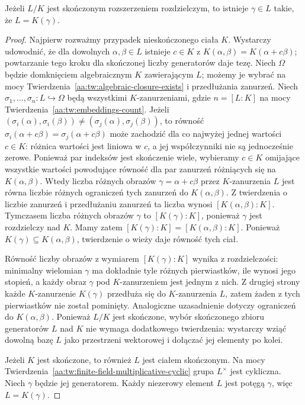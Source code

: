 \begin{twierdzenie}
\label{aa:tw:primitive-element}
Jeżeli $L/K$ jest skończonym rozszerzeniem rozdzielczym,
to istnieje $\gamma\in L$ takie, że $L=K(\gamma)$.
\end{twierdzenie}
\begin{proof}
Najpierw rozważmy przypadek nieskończonego ciała $K$.
Wystarczy udowodnić, że dla dowolnych $\alpha,\beta\in L$
istnieje $c\in K$ z $K(\alpha,\beta)=K(\alpha+c\beta)$;
powtarzanie tego kroku dla skończonej liczby generatorów
daje tezę.
Niech $\Omega$ będzie domknięciem algebraicznym $K$
zawierającym $L$; możemy je wybrać na mocy
Twierdzenia~\ref{aa:tw:algebraic-closure-exists}
i przedłużania zanurzeń. Niech
$\sigma_1,\ldots,\sigma_n:L\hookrightarrow\Omega$
będą wszystkimi $K$-zanurzeniami,
gdzie $n=[L:K]$ na mocy
Twierdzenia~\ref{aa:tw:embeddings-count}. Jeżeli
$(\sigma_i(\alpha),\sigma_i(\beta))\ne
(\sigma_j(\alpha),\sigma_j(\beta))$, to równość
$\sigma_i(\alpha+c\beta)=\sigma_j(\alpha+c\beta)$
może zachodzić dla co najwyżej jednej wartości $c\in K$:
różnica wartości jest liniowa w $c$, a jej współczynniki
nie są jednocześnie zerowe. Ponieważ par indeksów jest
skończenie wiele, wybieramy $c\in K$ omijające wszystkie
wartości powodujące równość dla par zanurzeń różniących się
na $K(\alpha,\beta)$. Wtedy liczba różnych obrazów
$\gamma=\alpha+c\beta$ przez $K$-zanurzenia $L$ jest równa
liczbie różnych ograniczeń tych zanurzeń do
$K(\alpha,\beta)$. Z twierdzenia o liczbie zanurzeń
i przedłużaniu zanurzeń ta liczba wynosi
$[K(\alpha,\beta):K]$. Tymczasem liczba różnych obrazów
$\gamma$ to $[K(\gamma):K]$, ponieważ $\gamma$ jest
rozdzielczy nad $K$. Mamy zatem
$[K(\gamma):K]=[K(\alpha,\beta):K]$.
Ponieważ $K(\gamma)\subseteq K(\alpha,\beta)$,
twierdzenie o wieży daje równość tych ciał.

Równość liczby obrazów z wymiarem $[K(\gamma):K]$
wynika z rozdzielczości: minimalny wielomian $\gamma$
ma dokładnie tyle różnych pierwiastków, ile wynosi jego stopień,
a każdy obraz $\gamma$ pod $K$-zanurzeniem jest jednym z nich.
Z drugiej strony każde $K$-zanurzenie $K(\gamma)$
przedłuża się do $K$-zanurzenia $L$, zatem żaden z tych
pierwiastków nie został pominięty. Analogiczne uzasadnienie
dotyczy ograniczeń do $K(\alpha,\beta)$.
Ponieważ $L/K$ jest skończone, wybór skończonego zbioru
generatorów $L$ nad $K$ nie wymaga dodatkowego twierdzenia:
wystarczy wziąć dowolną bazę $L$ jako przestrzeni wektorowej
i dołączać jej elementy po kolei.

Jeżeli $K$ jest skończone, to również $L$ jest ciałem
skończonym. Na mocy
Twierdzenia~\ref{aa:tw:finite-field-multiplicative-cyclic}
grupa $L^\times$ jest cykliczna. Niech $\gamma$ będzie
jej generatorem. Każdy niezerowy element $L$ jest potęgą
$\gamma$, więc $L=K(\gamma)$.
\end{proof}

